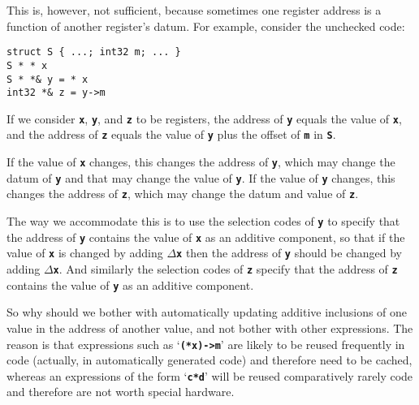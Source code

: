 \documentclass[12pt]{article}
\newcommand{\TT}[1]{{\tt \bfseries #1}}
\newenvironment{indpar}[1][0.3in]%
	{\begin{list}{}%
		     {\setlength{\itemsep}{0in}%
		      \setlength{\topsep}{0in}%
		      \setlength{\parsep}{1ex}%
		      \setlength{\labelwidth}{#1}%
		      \setlength{\leftmargin}{#1}%
		      \addtolength{\leftmargin}{\labelsep}}%
	 \item}%
	{\end{list}}
\begin{document}
This is, however, not sufficient, because sometimes one register
address is a function of another register's datum.  For example,
consider the unchecked code:
\begin{indpar}[0.5em]\begin{verbatim}
struct S { ...; int32 m; ... }
S * * x
S * *& y = * x
int32 *& z = y->m
\end{verbatim}\end{indpar}
If we consider \TT{x}, \TT{y}, and \TT{z} to be registers,
the address of \TT{y} equals the value of \TT{x}, and the
address of \TT{z} equals the value of \TT{y} plus the offset of
\TT{m} in \TT{S}.

If the value of \TT{x} changes, this changes the address of \TT{y},
which may change the datum of \TT{y} and that may change the value
of \TT{y}.  If the value of \TT{y} changes, this changes the address
of \TT{z}, which may change the datum and value of \TT{z}.

The way we accommodate this is to use the selection codes of \TT{y}
to specify that the address of \TT{y} contains the value of \TT{x}
as an additive component, so
that if the value of \TT{x} is changed by adding $\Delta$\TT{x}
then the address of \TT{y} should be changed by adding $\Delta$\TT{x}.
And similarly the selection codes
of \TT{z} specify that the address of \TT{z}
contains the value of \TT{y} as an additive component.

So why should we bother with automatically updating
additive inclusions of one value in the
address of another value, and not bother with other expressions.
The reason is that expressions such as
`\TT{(*x)->m}' are likely to be reused frequently in code (actually,
in automatically generated code) and
therefore need to be cached, whereas an expressions of the form
`\TT{c*d}' will be reused comparatively rarely code
and therefore are not worth special hardware.





\printindex
\end{document}
